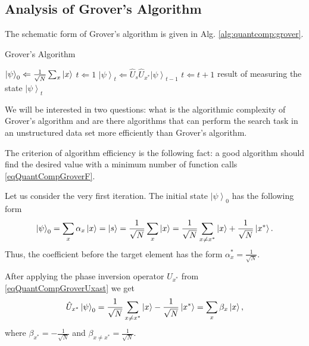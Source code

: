 \subsection{Analysis of Grover's Algorithm}

The schematic form of Grover's algorithm is given in Alg.
\ref{alg:quantcomp:grover}.  
\begin{algorithm}
\caption{Grover's Algorithm}
\label{alg:quantcomp:grover}
\begin{algorithmic}
    \STATE $\left|\psi\right>_0 \Leftarrow \frac{1}{\sqrt{N}}\sum_x 
    \ket{x}$
    \STATE $t \Leftarrow 1$
    \REPEAT
    \STATE $\left|\psi\right>_t \Leftarrow \hat{U}_s\hat{U}_{x^{\ast}}
    \left|\psi\right>_{t-1}$
    \STATE $t \Leftarrow t + 1$
    \RETURN result of measuring the state $\left|\psi\right>_t$
\end{algorithmic}
\end{algorithm}

We will be interested in two questions: what is the algorithmic complexity
of Grover's algorithm and are there algorithms that can perform
the search task in an unstructured data set more efficiently than
Grover's algorithm.

The criterion of algorithm efficiency is the following fact: a good
algorithm should find the desired value with a minimum number of function
calls \eqref{eqQuantCompGroverF}.

Let us consider the very first iteration. The initial state
$\left|\psi\right>_0$ has the following form
\begin{equation}
\left|\psi\right>_0 =
\sum_x \alpha_x \ket{x} =  
\ket{s} = 
\frac{1}{\sqrt{N}}\sum_x \ket{x} = 
\frac{1}{\sqrt{N}}\sum_{x\ne x^{\ast}} \ket{x} +
\frac{1}{\sqrt{N}} \left|x^{\ast}\right>.
\nonumber
\end{equation}
Thus, the coefficient before the target element has the form
$\alpha_x^{\ast} = \frac{1}{\sqrt{N}}$. 

After applying the phase inversion operator
$U_{x^{\ast}}$ from \eqref{eqQuantCompGroverUxast} we get
\begin{equation}
\hat{U}_{x^{\ast}} \left|\psi\right>_0 =
\frac{1}{\sqrt{N}}\sum_{x\ne x^{\ast}} \ket{x} - 
\frac{1}{\sqrt{N}} \left|x^{\ast}\right> = \sum_x \beta_x \ket{x},
\nonumber
\end{equation}
where $\beta_{x^\ast} = - \frac{1}{\sqrt{N}}$ and $\beta_{x \ne x^\ast} =
\frac{1}{\sqrt{N}}$. 

